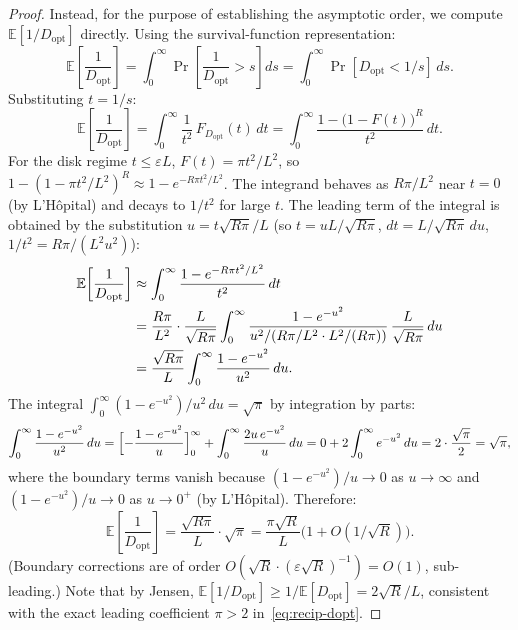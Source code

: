 \begin{proof}
Instead, for the purpose of establishing the asymptotic order, we compute
$\mathbb{E}[1/D_{\mathrm{opt}}]$ directly.
Using the survival-function representation:
\begin{equation}
  \mathbb{E}\!\left[\frac{1}{D_{\mathrm{opt}}}\right]
  = \int_0^\infty \Pr\!\left[\frac{1}{D_{\mathrm{opt}}} > s\right] ds
  = \int_0^\infty \Pr[D_{\mathrm{opt}} < 1/s]\,ds.
\end{equation}
Substituting $t = 1/s$:
\begin{equation}
  \mathbb{E}\!\left[\frac{1}{D_{\mathrm{opt}}}\right]
  = \int_0^\infty \frac{1}{t^2}\,F_{D_{\mathrm{opt}}}(t)\,dt
  = \int_0^\infty \frac{1-\bigl(1-F(t)\bigr)^R}{t^2}\,dt.
\end{equation}
For the disk regime $t \leq \varepsilon L$, $F(t) = \pi t^2/L^2$, so
$1-(1-\pi t^2/L^2)^R \approx 1 - e^{-R\pi t^2/L^2}$.
The integrand behaves as $R\pi/L^2$ near $t=0$ (by L'H\^opital) and
decays to $1/t^2$ for large $t$.
The leading term of the integral is obtained by the substitution
$u = t\sqrt{R\pi}/L$ (so $t = uL/\sqrt{R\pi}$, $dt = L/\sqrt{R\pi}\,du$,
$1/t^2 = R\pi/(L^2 u^2)$):
\begin{align}
  \mathbb{E}\!\left[\frac{1}{D_{\mathrm{opt}}}\right]
  &\approx \int_0^\infty \frac{1 - e^{-R\pi t^2/L^2}}{t^2}\,dt \notag\\
  &= \frac{R\pi}{L^2} \cdot \frac{L}{\sqrt{R\pi}}
     \int_0^\infty \frac{1-e^{-u^2}}{u^2/(R\pi/L^2 \cdot L^2/(R\pi))}\,
     \frac{L}{\sqrt{R\pi}}\,du \notag\\
  &= \frac{\sqrt{R\pi}}{L}\int_0^\infty \frac{1-e^{-u^2}}{u^2}\,du.
\end{align}
The integral $\int_0^\infty (1-e^{-u^2})/u^2\,du = \sqrt{\pi}$
by integration by parts:
\[
  \int_0^\infty \frac{1-e^{-u^2}}{u^2}\,du
  = \Bigl[-\frac{1-e^{-u^2}}{u}\Bigr]_0^\infty
    + \int_0^\infty \frac{2u\,e^{-u^2}}{u}\,du
  = 0 + 2\int_0^\infty e^{-u^2}\,du
  = 2 \cdot \frac{\sqrt{\pi}}{2} = \sqrt{\pi},
\]
where the boundary terms vanish because $(1-e^{-u^2})/u \to 0$ as
$u \to \infty$ and $(1-e^{-u^2})/u \to 0$ as $u \to 0^+$ (by L'H\^opital).
Therefore:
\begin{equation}\label{eq:recip-dopt}
  \mathbb{E}\!\left[\frac{1}{D_{\mathrm{opt}}}\right]
  = \frac{\sqrt{R\pi}}{L}\cdot\sqrt{\pi}
  = \frac{\pi\sqrt{R}}{L}
  \bigl(1 + O(1/\sqrt{R})\bigr).
\end{equation}
(Boundary corrections are of order $O(\sqrt{R} \cdot (\varepsilon\sqrt{R})^{-1}) = O(1)$,
sub-leading.)
Note that by Jensen, $\mathbb{E}[1/D_{\mathrm{opt}}] \geq
1/\mathbb{E}[D_{\mathrm{opt}}] = 2\sqrt{R}/L$, consistent with the
exact leading coefficient $\pi > 2$ in~\eqref{eq:recip-dopt}.


\end{proof}
